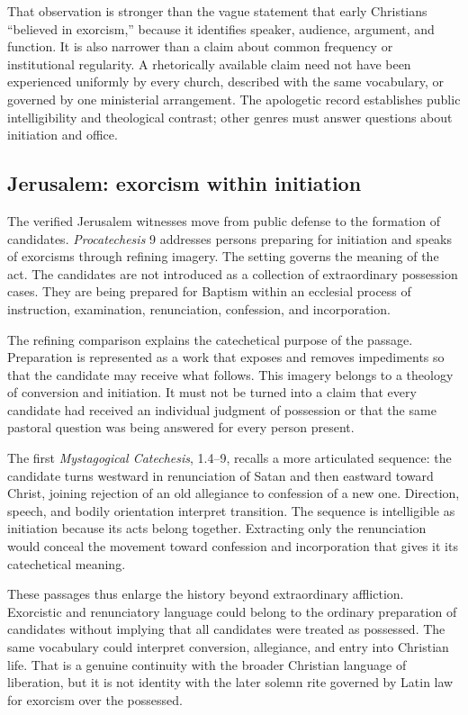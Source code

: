 That observation is stronger than the vague statement that early Christians
``believed in exorcism,'' because it identifies speaker, audience, argument,
and function. It is also narrower than a claim about common frequency or
institutional regularity. A rhetorically available claim need not have been
experienced uniformly by every church, described with the same vocabulary,
or governed by one ministerial arrangement. The apologetic record establishes
public intelligibility and theological contrast; other genres must answer
questions about initiation and office.

\subsection{Jerusalem: exorcism within initiation}

The verified Jerusalem witnesses move from public defense to the formation of
candidates. \emph{Procatechesis} 9 addresses persons preparing for initiation
and speaks of exorcisms through refining imagery. The setting governs the
meaning of the act. The candidates are not introduced as a collection of
extraordinary possession cases. They are being prepared for Baptism within an
ecclesial process of instruction, examination, renunciation, confession, and
incorporation.

The refining comparison explains the catechetical purpose of the passage.
Preparation is represented as a work that exposes and removes impediments so
that the candidate may receive what follows. This imagery belongs to a
theology of conversion and initiation. It must not be turned into a claim
that every candidate had received an individual judgment of possession or
that the same pastoral question was being answered for every person present.

The first \emph{Mystagogical Catechesis}, 1.4--9, recalls a more articulated
sequence: the candidate turns westward in renunciation of Satan and then
eastward toward Christ, joining rejection of an old allegiance to confession
of a new one. Direction, speech, and bodily orientation interpret transition.
The sequence is intelligible as initiation because its acts belong together.
Extracting only the renunciation would conceal the movement toward confession
and incorporation that gives it its catechetical meaning.

These passages thus enlarge the history beyond extraordinary affliction.
Exorcistic and renunciatory language could belong to the ordinary preparation
of candidates without implying that all candidates were treated as possessed.
The same vocabulary could interpret conversion, allegiance, and entry into
Christian life. That is a genuine continuity with the broader Christian
language of liberation, but it is not identity with the later solemn rite
governed by Latin law for exorcism over the possessed.

